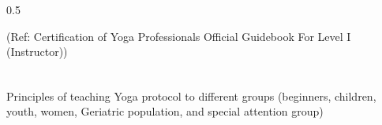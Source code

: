 \begin{frame}[fragile]
\begin{columns}
\begin{column}[T]{0.5\linewidth}
\begin{center}
		{\tiny (Ref: Certification  of Yoga Professionals Official Guidebook For Level I (Instructor))}		
        \end{center}	
    \end{column}
\end{columns}
\end{frame}


\begin{frame}[fragile]\frametitle{}
\begin{center}
{\Large Principles  of  teaching  Yoga  protocol  to  different  groups  (beginners,  children,  youth, women, Geriatric population, and special attention group)}
\end{center}
\end{frame}

